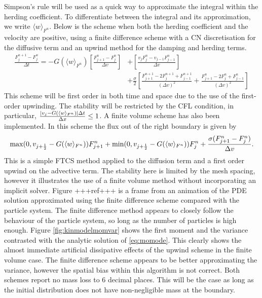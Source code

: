     Simpson's rule will be used as a quick way to approximate the integral within the herding coefficient. To differentiate between the integral and its approximation, we write \(\langle w\rangle_{F^n}\). Below is the scheme when both the herding coefficient and the velocity are positive, using a finite difference scheme with a CN discretisation for the diffusive term and an upwind method for the damping and herding terms.
    \begin{equation*}
    \begin{split}
    \frac{F_j^{n+1} - F_j^n}{\Delta t} = 	-G(\langle w\rangle_{F^n})\left[ \frac{F^n_{j+1} - F^n_{j}}{\Delta v}\right] &+\left[ \frac{v_{j}F^n_{j} - v_{j-1}F^n_{j-1}}{\Delta v}\right]\\ &+ \frac{\sigma}{2}\left[ \frac{F^{n+1}_{j+1} - 2F^{n+1}_j + F^{n+1}_{j-1}}{(\Delta v)^2} + \frac{F^{n}_{j+1} - 2F^{n}_j + F^{n}_{j-1}}{(\Delta v)^2}\right] 	 
    \end{split}
    \end{equation*}
    This scheme will be first order in both time and space due to the use of the first-order upwinding. The stability will be restricted by the CFL condition, in particular, $\frac{|v_j-G(\langle w\rangle_{F^n})|\Delta t}{\Delta x} \leq 1$. A finite volume scheme has also been implemented. In this scheme the flux out of the right boundary is given by 
     \[ \max(0, v_{j+\frac{1}{2}}-G(\langle w\rangle_{F^n}))F^n_{j+1} + \min(0, v_{j+\frac{1}{2}}-G(\langle w\rangle_{F^n}))F^n_j + \frac{\sigma(F^n_{j+1} - F^n_j)}{\Delta v}.
     \]
     This is a simple FTCS method applied to the diffusion term and a first order upwind on the advective term. The stability here is limited by the mesh spacing, however it illustrates the use of a finite volume method without incorporating an implicit solver. Figure +++ref+++ is a frame from an animation of the PDE solution approximated using the finite difference scheme compared with the particle system. The finite difference method appears to closely follow the behaviour of the particle system, so long as the number of particles is high enough. Figure \ref{fig:kinmodelmomvar} shows the first moment and the variance contrasted with the analytic solution of \eqref{eq:momode}. This clearly shows the almost immediate artificial dissipative effects of the upwind scheme in the finite volume case. The finite difference scheme appears to be better approximating the variance, however the spatial bias within this algorithm is not correct. Both schemes report no mass loss to 6 decimal places. This will be the case as long as the initial distribution does not have non-negligible mass at the boundary.
     
